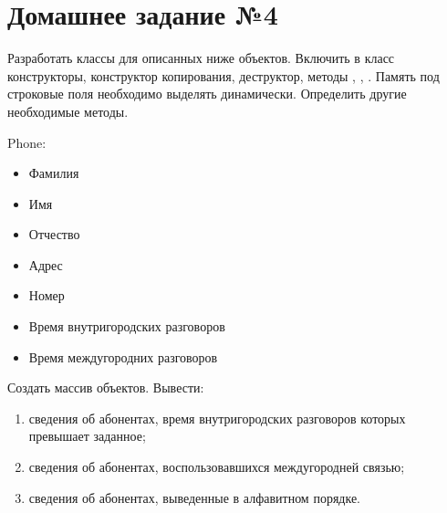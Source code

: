 \section*{Домашнее задание №4}

Разработать классы для описанных ниже объектов. Включить в класс
конструкторы, конструктор копирования, деструктор, методы ,
, . Память под строковые поля необходимо выделять
динамически. Определить другие необходимые методы.

Phone:
\begin{itemize}
	\item Фамилия
	\item Имя
	\item Отчество
	\item Адрес
	\item Номер
	\item Время внутригородских разговоров
	\item Время междугородних разговоров
\end{itemize}

Создать массив объектов. Вывести:
\begin{enumerate}
	\item сведения об абонентах, время внутригородских разговоров которых превышает заданное;
	\item сведения об абонентах, воспользовавшихся междугородней связью;
	\item сведения об абонентах, выведенные в алфавитном порядке.
\end{enumerate}
